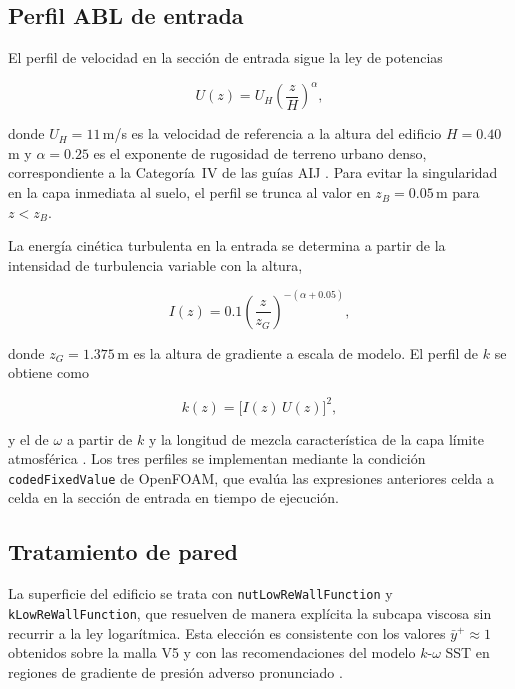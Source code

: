 \subsection{Perfil ABL de entrada}
\label{sec:abl_inlet}

El perfil de velocidad en la sección de entrada sigue la ley de potencias

\begin{equation}
    U(z) = U_H \left(\frac{z}{H}\right)^{\!\alpha},
    \label{eq:abl_powerlaw}
\end{equation}

donde $U_H = 11$\,m/s es la velocidad de referencia a la altura del edificio $H = 0.40$\,m y $\alpha = 0.25$ es el exponente de rugosidad de terreno urbano denso, correspondiente a la Categoría~IV de las guías AIJ \cite{tominaga2008}. Para evitar la singularidad en la capa inmediata al suelo, el perfil se trunca al valor en $z_B = 0.05$\,m para $z < z_B$.

La energía cinética turbulenta en la entrada se determina a partir de la intensidad de turbulencia variable con la altura,

\begin{equation}
    I(z) = 0.1 \left(\frac{z}{z_G}\right)^{-(\alpha + 0.05)},
    \label{eq:abl_intensity}
\end{equation}

donde $z_G = 1.375$\,m es la altura de gradiente a escala de modelo. El perfil de $k$ se obtiene como

\begin{equation}
    k(z) = \bigl[I(z)\,U(z)\bigr]^2,
    \label{eq:abl_k}
\end{equation}

y el de $\omega$ a partir de $k$ y la longitud de mezcla característica de la capa límite atmosférica \cite{tominaga2008}. Los tres perfiles se implementan mediante la condición \texttt{codedFixedValue} de OpenFOAM, que evalúa las expresiones anteriores celda a celda en la sección de entrada en tiempo de ejecución.

\subsection{Tratamiento de pared}
\label{sec:wall_treatment}

La superficie del edificio se trata con \texttt{nutLowReWallFunction} y \texttt{kLowReWallFunction}, que resuelven de manera explícita la subcapa viscosa sin recurrir a la ley logarítmica. Esta elección es consistente con los valores $\bar{y}^+ \approx 1$ obtenidos sobre la malla V5 y con las recomendaciones del modelo $k$-$\omega$ SST en regiones de gradiente de presión adverso pronunciado \cite{menter1994}.

